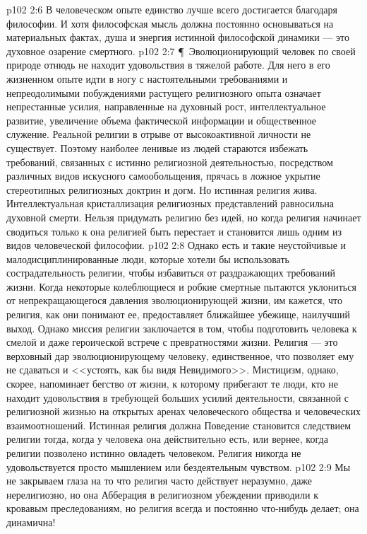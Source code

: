 \vs p102 2:6 В человеческом опыте единство лучше всего достигается благодаря философии. И хотя философская мысль должна постоянно основываться на материальных фактах, душа и энергия истинной философской динамики --- это духовное озарение смертного.
\vs p102 2:7 \P\ Эволюционирующий человек по своей природе отнюдь не находит удовольствия в тяжелой работе. Для него в его жизненном опыте идти в ногу с настоятельными требованиями и непреодолимыми побуждениями растущего религиозного опыта означает непрестанные усилия, направленные на духовный рост, интеллектуальное развитие, увеличение объема фактической информации и общественное служение. Реальной религии в отрыве от высокоактивной личности не существует. Поэтому наиболее ленивые из людей стараются избежать требований, связанных с истинно религиозной деятельностью, посредством различных видов искусного самообольщения, прячась в ложное укрытие стереотипных религиозных доктрин и догм. Но истинная религия жива. Интеллектуальная кристаллизация религиозных представлений равносильна духовной смерти. Нельзя придумать религию без идей, но когда религия начинает сводиться только к  она религией быть перестает и становится лишь одним из видов человеческой философии.
\vs p102 2:8 Однако есть и такие неустойчивые и малодисциплинированные люди, которые хотели бы использовать сострадательность религии, чтобы избавиться от раздражающих требований жизни. Когда некоторые колеблющиеся и робкие смертные пытаются уклониться от непрекращающегося давления эволюционирующей жизни, им кажется, что религия, как они понимают ее, предоставляет ближайшее убежище, наилучший выход. Однако миссия религии заключается в том, чтобы подготовить человека к смелой и даже героической встрече с превратностями жизни. Религия --- это верховный дар эволюционирующему человеку, единственное, что позволяет ему не сдаваться и <<устоять, как бы видя Невидимого>>. Мистицизм, однако, скорее, напоминает бегство от жизни, к которому прибегают те люди, кто не находит удовольствия в требующей больших усилий деятельности, связанной с религиозной жизнью на открытых аренах человеческого общества и человеческих взаимоотношений. Истинная религия должна  Поведение становится следствием религии тогда, когда у человека она действительно есть, или вернее, когда религии позволено истинно овладеть человеком. Религия никогда не удовольствуется просто мышлением или бездеятельным чувством.
\vs p102 2:9 Мы не закрываем глаза на то что религия часто действует неразумно, даже нерелигиозно, но она  Абберация в религиозном убеждении приводили к кровавым преследованиям, но религия всегда и постоянно что\hyp{}нибудь делает; она динамична!

